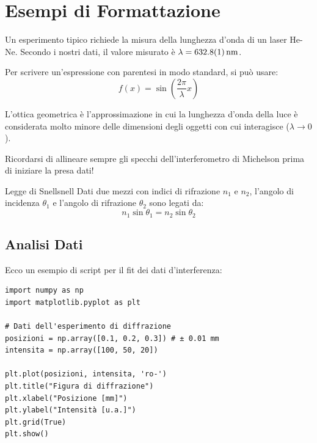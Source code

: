 \documentclass[openany,a4paper,12pt]{book}
\begin{document}
\section{Esempi di Formattazione}

Un esperimento tipico richiede la misura della lunghezza d'onda di un laser He-Ne. Secondo i nostri dati, il valore misurato è $\lambda = \qty{632.8 \pm 0.1}{\nano\metre}$. 

Per scrivere un'espressione con parentesi in modo standard, si può usare:
\begin{equation}
    f(x) = \sin\left(\frac{2\pi}{\lambda} x\right)
\end{equation}

\begin{definizione}
L'ottica geometrica è l'approssimazione in cui la lunghezza d'onda della luce è considerata molto minore delle dimensioni degli oggetti con cui interagisce ($\lambda \to 0$).
\end{definizione}

\begin{nota}
Ricordarsi di allineare sempre gli specchi dell'interferometro di Michelson prima di iniziare la presa dati!
\end{nota}

\begin{teorema}{Legge di Snell}{snell}
Dati due mezzi con indici di rifrazione $n_1$ e $n_2$, l'angolo di incidenza $\theta_1$ e l'angolo di rifrazione $\theta_2$ sono legati da:
\begin{equation}
    n_1 \sin\theta_1 = n_2 \sin\theta_2
\end{equation}
\end{teorema}

\subsection{Analisi Dati}
Ecco un esempio di script per il fit dei dati d'interferenza:

\begin{lstlisting}
import numpy as np
import matplotlib.pyplot as plt

# Dati dell'esperimento di diffrazione
posizioni = np.array([0.1, 0.2, 0.3]) # ± 0.01 mm
intensita = np.array([100, 50, 20])

plt.plot(posizioni, intensita, 'ro-')
plt.title("Figura di diffrazione")
plt.xlabel("Posizione [mm]")
plt.ylabel("Intensità [u.a.]")
plt.grid(True)
plt.show()
\end{lstlisting}
\end{document}
